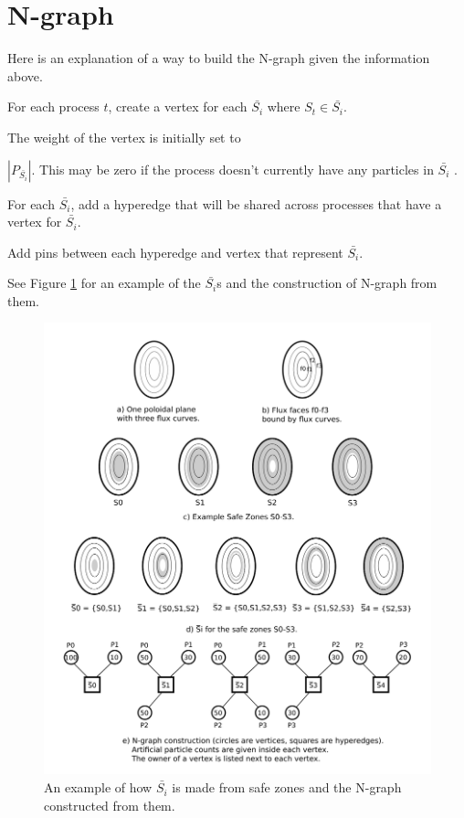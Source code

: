 \documentclass[a4paper]{article}
\begin{document}
\section{N-graph}
Here is an explanation of a way to build the N-graph given the information above.
\begin{enumerate}
  {\color{blue}
  \item For each process $t$, create a vertex for each $\bar{S_i}$ where $S_t \in \bar{S_i}$.
  }
\item The weight of the vertex is initially set to {\color{blue} $|P_{\bar{S_i}}|$. This may be zero if the process doesn't currently have any particles in $\bar{S_i}$ .
\item For each $\bar{S_i}$, add a hyperedge that will be shared across processes that have a vertex for $\bar{S_i}$.}
\item Add pins between each hyperedge and vertex that represent {\color{blue} $\bar{S_i}$.}
\end{enumerate}
{ \color{blue}
  See Figure \ref{fig:construct} for an example of the $\bar{S_i}$s and the construction of N-graph from them. \\
  }


\begin{figure}[!ht]
  \centering
  \includegraphics[width=.9\textwidth]{xgcm_ngraph_construction.png}
  \caption{An example of how $\bar{S_i}$ is made from safe zones and the N-graph constructed from them.}
  \label{fig:construct}
\end{figure}
\end{document}
